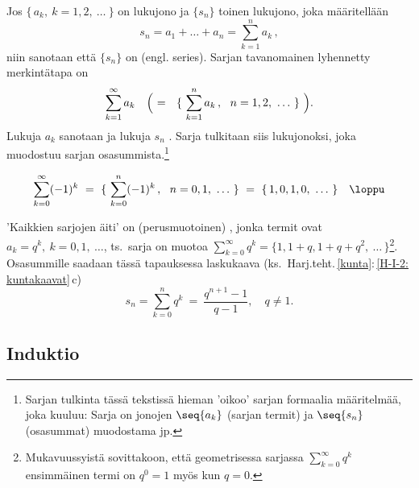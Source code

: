 Jos $\{\,a_k,\ k = 1,2,\ \ldots\ \}$ on lukujono ja $\{s_n\}$ toinen lukujono, joka
määritellään
\[
s_n = a_1 + \ldots + a_n = \sum_{k=1}^{n} a_k\,,
\]
niin sanotaan että $\{s_n\}$ on  (engl. series). Sarjan tavanomainen lyhennetty 
merkintätapa on
\[
\sum_{k=1}^{\infty} a_k \quad \Bigl(\ = \ \ \{\ \sum_{k=1}^{n} a_k\,,\ \ n = 1,2,\ \ldots\ \}\ 
\Bigr).
\]
Lukuja $a_k$ sanotaan  ja lukuja $s_n$ . Sarja
tulkitaan siis lukujonoksi, joka muodostuu sarjan osasummista.\footnote[2]{Sarjan tulkinta tässä
tekstissä hieman 'oikoo' sarjan formaalia määritelmää, joka kuuluu: Sarja on jonojen $\seq{a_k}$
(sarjan termit) ja $\seq{s_n}$ (osasummat) muodostama j\pain{ono}p\pain{ari}.}
\begin{Exa}
\[
\sum_{k=0}^{\infty} (-1)^k\ =\ \{\ \sum_{k=0}^{n} (-1)^k\,,\ \ n 
                            = 0,1,\ \ldots\ \}\ = \ \{\,1,0,1,0,\ \ldots\ \} \quad \loppu
\] 
\end{Exa}
'Kaikkien sarjojen äiti' on (perusmuotoinen)
, jonka termit ovat $a_k = q^k,\ k = 0,1,\ \ldots$, ts.\ sarja on muotoa 
$\sum_{k=0}^\infty q^k = \{1,1+q,1+q+q^2,\ \ldots\,\}$\footnote[3]{Mukavuussyistä sovittakoon,
että geometrisessa sarjassa $\sum_{k=0}^\infty q^k$ ensimmäinen termi on $q^0 = 1$ myös kun 
$q=0$.}. Osasummille saadaan tässä tapauksessa laskukaava
(ks.\ Harj.teht.\,\ref{kunta}:\,\ref{H-I-2: kuntakaavat}\,c)
\[
\boxed{\ s_n = \sum_{k=0}^n q^k\ =\ \dfrac{q^{n+1}-1}{q-1}, \quad q \neq 1.\ }
\]

\subsection{Induktio}
%

